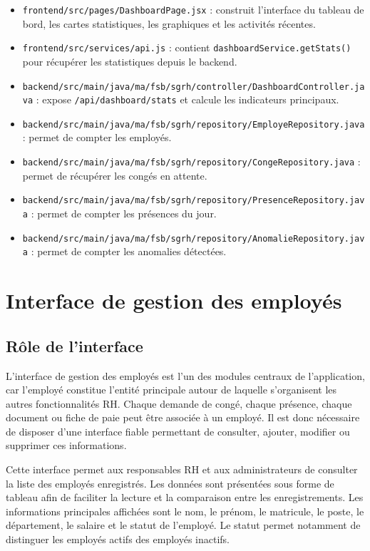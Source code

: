 \documentclass[12pt,a4paper]{report}
\begin{document}
\begin{itemize}
    \item \texttt{frontend/src/pages/DashboardPage.jsx} : construit l'interface du tableau de bord, les cartes statistiques, les graphiques et les activités récentes.
    \item \texttt{frontend/src/services/api.js} : contient \texttt{dashboardService.getStats()} pour récupérer les statistiques depuis le backend.
    \item \texttt{backend/src/main/java/ma/fsb/sgrh/controller/DashboardController.java} : expose \texttt{/api/dashboard/stats} et calcule les indicateurs principaux.
    \item \texttt{backend/src/main/java/ma/fsb/sgrh/repository/EmployeRepository.java} : permet de compter les employés.
    \item \texttt{backend/src/main/java/ma/fsb/sgrh/repository/CongeRepository.java} : permet de récupérer les congés en attente.
    \item \texttt{backend/src/main/java/ma/fsb/sgrh/repository/PresenceRepository.java} : permet de compter les présences du jour.
    \item \texttt{backend/src/main/java/ma/fsb/sgrh/repository/AnomalieRepository.java} : permet de compter les anomalies détectées.
\end{itemize}

\section{Interface de gestion des employés}

\subsection{Rôle de l'interface}

L'interface de gestion des employés est l'un des modules centraux de l'application, car l'employé constitue l'entité principale autour de laquelle s'organisent les autres fonctionnalités RH. Chaque demande de congé, chaque présence, chaque document ou fiche de paie peut être associée à un employé. Il est donc nécessaire de disposer d'une interface fiable permettant de consulter, ajouter, modifier ou supprimer ces informations.

Cette interface permet aux responsables RH et aux administrateurs de consulter la liste des employés enregistrés. Les données sont présentées sous forme de tableau afin de faciliter la lecture et la comparaison entre les enregistrements. Les informations principales affichées sont le nom, le prénom, le matricule, le poste, le département, le salaire et le statut de l'employé. Le statut permet notamment de distinguer les employés actifs des employés inactifs.
\end{document}
